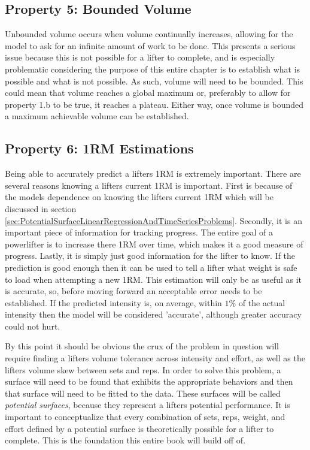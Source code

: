 \subsection{Property 5: Bounded Volume}
\label{sec:PotentialSurfaceIntuitiveRelationshipsBetweenVariablesBoundedVolume}

Unbounded volume occurs when volume continually increases, allowing for the model to ask for an infinite amount of work to be done. This presents a serious issue because this is not possible for a lifter to complete, and is especially problematic considering the purpose of this entire chapter is to establish what is possible and what is not possible. As such, volume will need to be bounded. This could mean that volume reaches a global maximum or, preferably to allow for property 1.b to be true, it reaches a plateau. Either way, once volume is bounded a maximum achievable volume can be established.

\subsection{Property 6: 1RM Estimations}
\label{sec:PotentialSurfaceIntuitiveRelationshipsBetweenVariables1RMEstimations}

Being able to accurately predict a lifters 1RM is extremely important. There are several reasons knowing a lifters current 1RM is important. First is because of the models dependence on knowing the lifters current 1RM which will be discussed in section \ref{sec:PotentialSurfaceLinearRegressionAndTimeSeriesProblems}. Secondly, it is an important piece of information for tracking progress. The entire goal of a powerlifter is to increase there 1RM over time, which makes it a good measure of progress. Lastly, it is simply just good information for the lifter to know. If the prediction is good enough then it can be used to tell a lifter what weight is safe to load when attempting a new 1RM. This estimation will only be as useful as it is accurate, so, before moving forward an acceptable error needs to be established. If the predicted intensity is, on average, within $1\%$ of the actual intensity then the model will be considered 'accurate', although greater accuracy could not hurt.

By this point it should be obvious the crux of the problem in question will require finding a lifters volume tolerance across intensity and effort, as well as the lifters volume skew between sets and reps. In order to solve this problem, a surface will need to be found that exhibits the appropriate behaviors and then that surface will need to be fitted to the data. These surfaces will be called \textit{potential surfaces}, because they represent a lifters potential performance. It is important to conceptualize that every combination of sets, reps, weight, and effort defined by a potential surface is theoretically possible for a lifter to complete. This is the foundation this entire book will build off of.


